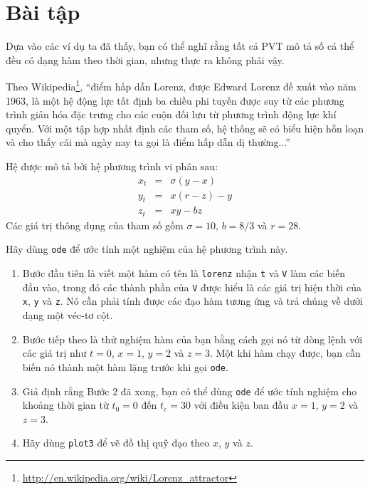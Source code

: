 \documentclass[12pt]{book}
\begin{document}
\section{Bài tập}

\begin{ex}

Dựa vào các ví dụ ta đã thấy, bạn có thể nghĩ rằng tất cả PVT
mô tả số cá thể đều có dạng hàm theo thời gian, nhưng thực ra
không phải vậy.

Theo Wikipedia\footnote{\url{http://en.wikipedia.org/wiki/Lorenz_attractor}},
``điểm hấp dẫn Lorenz, được Edward Lorenz đề xuất vào năm 1963, là
một hệ động lực tất định ba chiều phi tuyến được suy từ các phương trình
giản hóa đặc trưng cho các cuộn đối lưu từ phương trình động lực khí quyển.
Với một tập hợp nhất định các tham số, hệ thống sẽ có biểu hiện hỗn loạn
và cho thấy cái mà ngày nay ta gọi là điểm hấp dẫn dị thường...''

Hệ được mô tả bởi hệ phương trình vi phân sau:
%
\begin{eqnarray}
x_t &=& \sigma (y - x)  \\
y_t &=& x (r - z) - y   \\
z_t &=& xy - b z
\end{eqnarray}
%
Các giá trị thông dụng của tham số gồm $\sigma = 10$, $b = 8/3$ và $r=28$.

Hãy dùng {\tt ode} để ước tính một nghiệm của hệ phương trình này.


\begin{enumerate}

\item Bước đầu tiên là viết một hàm có tên là {\tt lorenz} nhận 
{\tt t} và {\tt V} làm các biến đầu vào, trong đó các thành phần 
của {\tt V} được hiểu là các giá trị hiện thời của {\tt x},
{\tt y} và {\tt z}. Nó cần phải tính được các đạo hàm tương ứng
và trả chúng về dưới dạng một véc-tơ cột.

\item Bước tiếp theo là thử nghiệm hàm của bạn bằng cách gọi nó
từ dòng lệnh với các giá trị như 
$t=0$, $x=1$, $y=2$ và $z=3$. Một khi hàm chạy được, bạn cần
biến nó thành một hàm lặng trước khi gọi {\tt ode}.

\item Giả định rằng Bước 2 đã xong, bạn có thể dùng {\tt ode}
để ước tính nghiệm cho khoảng thời gian từ $t_0 = 0$ đến $t_e = 30$
với điều kiện ban đầu $x=1$, $y=2$ và $z=3$.

\item Hãy dùng {\tt plot3} để vẽ đồ thị quỹ đạo theo 
$x$, $y$ và $z$.

\end{enumerate}

\end{ex}
\end{document}
